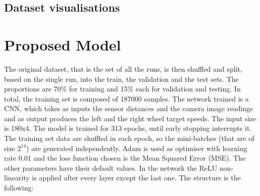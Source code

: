 \documentclass[conference]{IEEEtran}
\begin{document}
\subsection{Dataset visualisations}
%
%
%
%


\section{Proposed Model}
The original dataset, that is the set of all the runs, is then shuffled and split, based on the single run, into the 
train, the validation and the test sets. The proportions are 70\% for training and 15\% each for validation and 
testing. In total, the training set is composed of 187000 samples.
The network trained is a CNN,  which takes as inputs the sensor distances and the camera image readings and as output 
produces the left and the right wheel target speeds. 
The input size is 180x4. The model is trained for 313 epochs, until early stopping interrupts it. 
The training set data are shuffled in each epoch, so the mini-batches (that are of size $2^14$) are generated 
independently. 
Adam is used as optimiser with learning rate $0.01$ and the loss function chosen is the Mean Squared Error (MSE). The 
other parameters have their default values. 
In the network the ReLU non-linearity is applied after every layer except the last one. 
The structure is the following:
\end{document}
